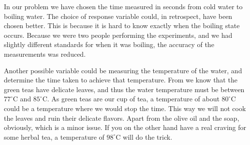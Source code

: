 In our problem we have chosen the time measured in seconds from cold water to boiling water. The choice of response variable could, in retrospect, have been chosen better. This is because it is hard to know exactly when the boiling state occurs. Because we were two people performing the experiments, and we had slightly different standards for when it was boiling, the accuracy of the measurements was reduced.

Another possible variable could be measuring the temperature of the water, and determine the time taken to achieve that temperature. From \cite{teaTemperatures} we know that the green teas have delicate leaves, and thus the water temperature must be between $77 ^\circ$C and $85 ^\circ$C. As green teas are our cup of tea, a temperature of about $80 ^\circ$C could be a temperature where we would stop the time. This way we will not cook the leaves and ruin their delicate flavors. Apart from the olive oil and the soap, obviously, which is a minor issue. If you on the other hand have a real craving for some herbal tea, a temperature of $98 ^\circ$C will do the trick.